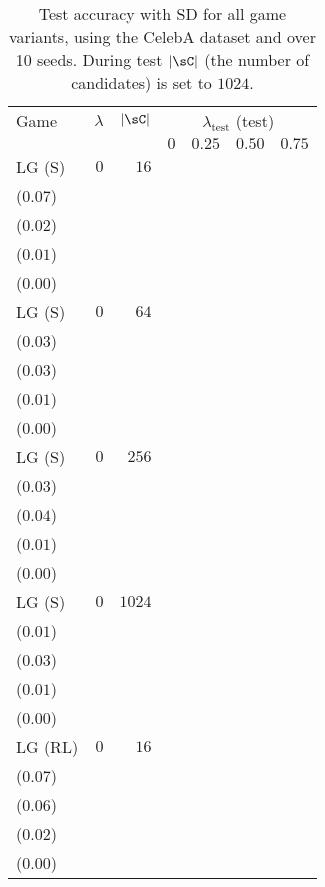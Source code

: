 \begin{table}[t]
\centering
\caption{Test accuracy with SD for all game variants, using the CelebA dataset and over 10 seeds. During test \(|\sC|\) (the number of candidates) is set to \(1024\).}
\label{table:test_lg_celeba_reward_1024}
\begin{tabular}{lrrrrrr}
\toprule
Game & \(\lambda\) & \(|\sC|\) & \multicolumn{4}{c}{\(\lambda_\text{test}\) (test)} \\[1ex]
 &  &  & \multicolumn{1}{c}{\(0\)} & \multicolumn{1}{c}{\(0.25\)} & \multicolumn{1}{c}{\(0.50\)} & \multicolumn{1}{c}{\(0.75\)}\\
\midrule
LG {\scriptsize(S)} & \(0\) & \(16\) & \longcell{\(0.56\)\\{\tiny(\(0.07\))}} & \longcell{\(0.14\)\\{\tiny(\(0.02\))}} & \longcell{\(0.03\)\\{\tiny(\(0.01\))}} & \longcell{\(0.00\)\\{\tiny(\(0.00\))}} \\[2.2ex]
LG {\scriptsize(S)} & \(0\) & \(64\) & \longcell{\(0.76\)\\{\tiny(\(0.03\))}} & \longcell{\(0.21\)\\{\tiny(\(0.03\))}} & \longcell{\(0.04\)\\{\tiny(\(0.01\))}} & \longcell{\(0.00\)\\{\tiny(\(0.00\))}} \\[2.2ex]
LG {\scriptsize(S)} & \(0\) & \(256\) & \longcell{\(0.81\)\\{\tiny(\(0.03\))}} & \longcell{\(0.21\)\\{\tiny(\(0.04\))}} & \longcell{\(0.04\)\\{\tiny(\(0.01\))}} & \longcell{\(0.00\)\\{\tiny(\(0.00\))}} \\[2.2ex]
LG {\scriptsize(S)} & \(0\) & \(1024\) & \longcell{\(0.75\)\\{\tiny(\(0.01\))}} & \longcell{\(0.19\)\\{\tiny(\(0.03\))}} & \longcell{\(0.03\)\\{\tiny(\(0.01\))}} & \longcell{\(0.01\)\\{\tiny(\(0.00\))}} \\[2.2ex]
LG {\scriptsize(RL)} & \(0\) & \(16\) & \longcell{\(0.58\)\\{\tiny(\(0.07\))}} & \longcell{\(0.18\)\\{\tiny(\(0.06\))}} & \longcell{\(0.04\)\\{\tiny(\(0.02\))}} & \longcell{\(0.01\)\\{\tiny(\(0.00\))}} \\[2.2ex]

\end{tabular}
\end{table}
